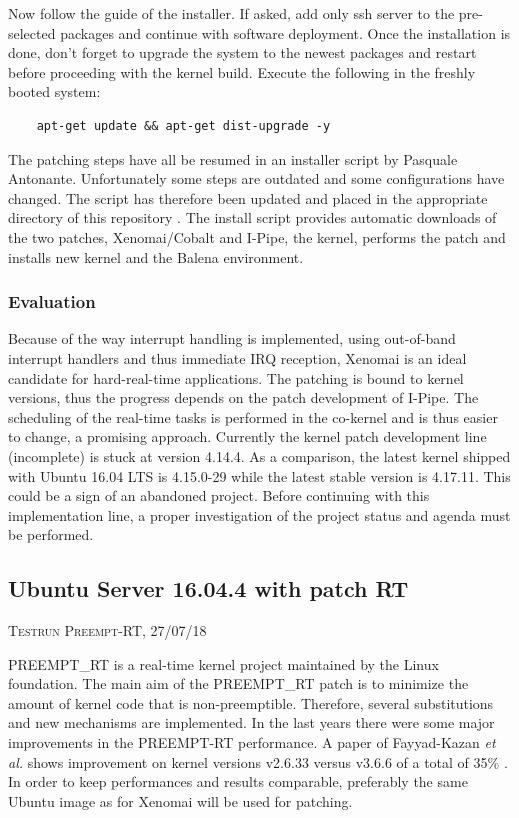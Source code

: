 \documentclass[]{scrartcl}
\begin{document}
Now follow the guide of the installer. If asked, add only ssh server to the pre-selected packages and continue with software deployment. 
Once the installation is done, don't forget to upgrade the system to the newest packages and restart before proceeding with the kernel build.
Execute the following in the freshly booted system:

\begin{verbatim}
	apt-get update && apt-get dist-upgrade -y
\end{verbatim}

The patching steps have all be resumed in an installer script by Pasquale Antonante. Unfortunately some steps are outdated and some configurations have changed.
The script has therefore been updated and placed in the appropriate directory of this repository \cite{gitrepo}. 
The install script provides automatic downloads of the two patches, Xenomai/Cobalt and I-Pipe, the kernel, performs the patch and installs new kernel and the Balena environment.

\subsubsection{Evaluation}

Because of the way interrupt handling is implemented, using out-of-band interrupt handlers and thus immediate IRQ reception, Xenomai is an ideal candidate for hard-real-time applications. 
The patching is bound to kernel versions, thus the progress depends on the patch development of I-Pipe. 
The scheduling of the real-time tasks is performed in the co-kernel and is thus easier to change, a promising approach.
Currently the kernel patch development line (incomplete) is stuck at version 4.14.4. As a comparison, the latest kernel shipped with Ubuntu 16.04 LTS is 4.15.0-29 while the latest stable version is 4.17.11. 
This could be a sign of an abandoned project. Before continuing with this implementation line, a proper investigation of the project status and agenda must be performed.

\subsection{Ubuntu Server 16.04.4 with patch RT}

{\small\textsc{Testrun Preempt-RT, 27/07/18} \bigskip}

PREEMPT\_RT is a real-time kernel project maintained by the Linux foundation. 
The main aim of the PREEMPT\_RT patch is to minimize the amount of kernel code that is non-preemptible. Therefore, several substitutions and new mechanisms are implemented.
In the last years there were some major improvements in the PREEMPT-RT performance. A paper of Fayyad-Kazan \textit{et al.} shows improvement on kernel versions v2.6.33 versus v3.6.6 of a total of 35\% \cite{Fayyad-Kazanetal2014}. In order to keep performances and results comparable, preferably the same Ubuntu image as for Xenomai will be used for patching.
\end{document}
